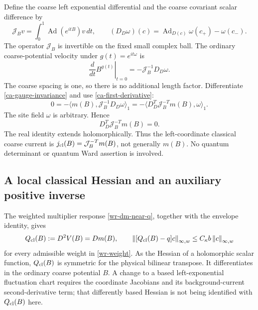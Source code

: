 \documentclass[11pt]{article}
\theoremstyle{remark}
\newcommand{\norm}[1]{\left\|#1\right\|}
\begin{document}
Define the coarse left exponential differential and the
coarse covariant scalar difference by
\begin{equation}\label{ca-left-differential}
 \mathcal J_Bv=\int_0^1\operatorname{Ad}(e^{itB})v\,dt,
 \qquad
 (D_D\omega)(c)=\operatorname{Ad}_{D(c)}\omega(c_+)-\omega(c_-).
\end{equation}
The operator $\mathcal J_B$ is invertible on the fixed small
complex ball. The ordinary coarse-potential velocity under
$g(t)=e^{it\omega}$ is
\begin{equation}\label{ca-gauge-velocity}
 \left.\frac{d}{dt}B^{g(t)}\right|_{t=0}
             =-\mathcal J_B^{-1}D_D\omega.
\end{equation}
The coarse spacing is one, so there is no additional length
factor. Differentiate \eqref{ca-gauge-invariance} and use
\eqref{ca-first-derivative}:
\[
 0=-\langle m(B),\mathcal J_B^{-1}D_D\omega\rangle_1
   =-\langle D_D^T\mathcal J_B^{-T}m(B),\omega\rangle_1.
\]
The site field $\omega$ is arbitrary. Hence
\begin{equation}\label{ca-ward}
 \boxed{\qquad D_D^T\mathcal J_B^{-T}m(B)=0.\qquad}
\end{equation}
The real identity extends holomorphically. Thus the
left-coordinate classical coarse current is
$j_{\rm cl}(B)=\mathcal J_B^{-T}m(B)$, not generally $m(B)$.
No quantum determinant or quantum Ward assertion is involved.

\subsection{A local classical Hessian and an auxiliary positive inverse}
\label{ca-precision-section}

The weighted multiplier response \eqref{wr-dm-near-q}, together
with the envelope identity, gives
\begin{equation}\label{ca-hessian-weighted}
 Q_{\rm cl}(B):=D^2V(B)=Dm(B),\qquad
 \norm{[Q_{\rm cl}(B)-q]c}_{\infty,w}
       \le C_\kappa b\norm c_{\infty,w}
\end{equation}
for every admissible weight in \eqref{wr-weight}. As the
Hessian of a holomorphic scalar function, $Q_{\rm cl}(B)$
is symmetric for the physical bilinear transpose.
It differentiates in the ordinary coarse potential $B$.
A change to a based left-exponential fluctuation chart
requires the coordinate Jacobians and its background-current
second-derivative term; that differently based Hessian is
not being identified with $Q_{\rm cl}(B)$ here.
\end{document}
